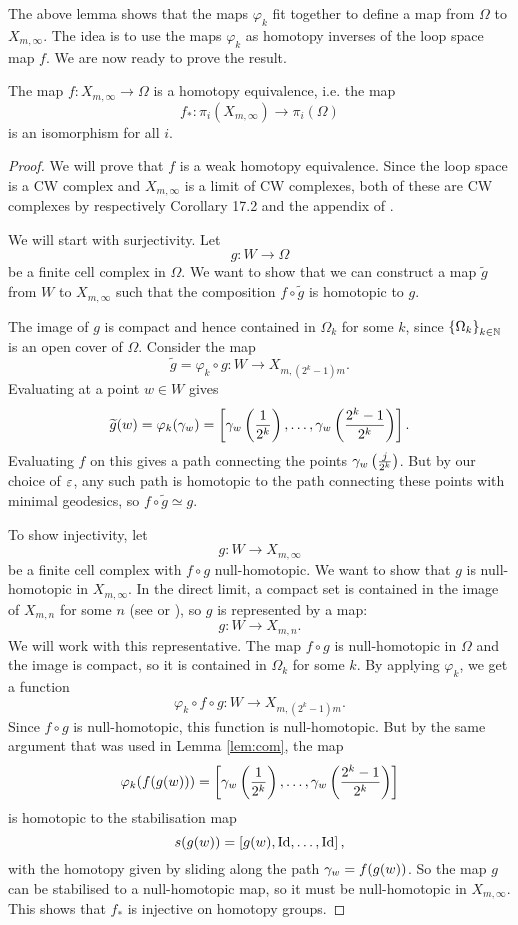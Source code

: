 The above lemma shows that the maps $\varphi_k$ fit together to define
a map from $\Omega$ to $X_{m,\infty}$.
The idea is to use the maps $\varphi_k$ as homotopy inverses of the
loop space map $f$. We are now ready to prove the result.

\begin{theorem}
  \label{thm:loekker}
  The map $f : X_{m,\infty} \to \Omega$ is a homotopy
  equivalence, i.e. the map
  \[f_* : \pi_i(X_{m,\infty}) \to \pi_i(\Omega)\]
  is an isomorphism for all $i$.
\end{theorem}

\begin{proof}
  We will prove that $f$ is a weak homotopy equivalence. Since the
  loop space is a CW complex and $X_{m,\infty}$ is a limit of CW
  complexes, both of these are CW complexes by respectively Corollary
  17.2 and the
  appendix of \cite{milnor}.
  
  We will start with surjectivity. Let
  \[ g : W \to \Omega \]
  be a finite cell complex in $\Omega$. We want to show that we can
  construct a map $\widetilde g$ from $W$ to $X_{m,\infty}$ such that
  the composition $f\circ \widetilde g$ is homotopic to $g$.
  
  The image of $g$ is compact and hence contained in $\Omega_k$ for
  some $k$, since $\left\{ \Omega_k \right\}_{k\in\mathbb{N}}$ is an open cover of
  $\Omega$. Consider the map 
  \[ \widetilde g = \varphi_k\circ g : W \to X_{m,(2^k-1)m}. \]
  Evaluating at a point $w\in W$ gives
  \[ \widetilde g(w) = \varphi_k(\gamma_w) = \left[
    \gamma_w\left(\frac{1}{2^k}\right),\dots,
    \gamma_w\left(\frac{2^k-1}{2^k}\right) \right]. \]
  Evaluating $f$ on this gives a path connecting the points
  $\gamma_w\left(\frac{j}{2^k}\right)$. But by our choice of $\varepsilon$, any
  such path is homotopic to the path connecting these points with
  minimal geodesics, so $f\circ\widetilde g \simeq g$.

  To show injectivity, let
  \[ g : W \to X_{m,\infty}\]
  be a finite cell complex with $f\circ g$ null-homotopic. We want to
  show that $g$ is null-homotopic in $X_{m,\infty}$. In the
  direct limit, a compact set is contained in the image of $X_{m,n}$
  for some $n$ (see \cite[Proposition~A.1]{hatcher} or
  \cite[Chapter~9.4]{may}), so $g$ is represented by a map:
  \[ g : W \to X_{m,n}. \]
  We will work with this representative. The map $f\circ
  g$ is null-homotopic in $\Omega$ and the image is compact, so it is
  contained in $\Omega_k$ for some $k$. By applying $\varphi_k$, we
  get a function
  \[ \varphi_k\circ f\circ g : W \to X_{m,(2^k-1)m}. \]
  Since $f\circ g$ is null-homotopic, this function is
  null-homotopic. But by the same argument that was used in
  Lemma \ref{lem:com}, the map
  \[ \varphi_k(f(g(w))) = \left[
    \gamma_w\left(\frac{1}{2^k}\right),\dots,\gamma_w\left(\frac{2^k-1}{2^k}
    \right)\right] \] 
  is homotopic to the stabilisation map
  \[ s(g(w)) = \left[g(w),\operatorname{Id},\dots,\operatorname{Id}\right], \]
  with the homotopy given by sliding along the path $\gamma_w=f(g(w))$.
  So the map $g$ can be stabilised to a null-homotopic map, so it must
  be null-homotopic in $X_{m,\infty}$. This shows that $f_*$ is
  injective on homotopy groups.
\end{proof}

